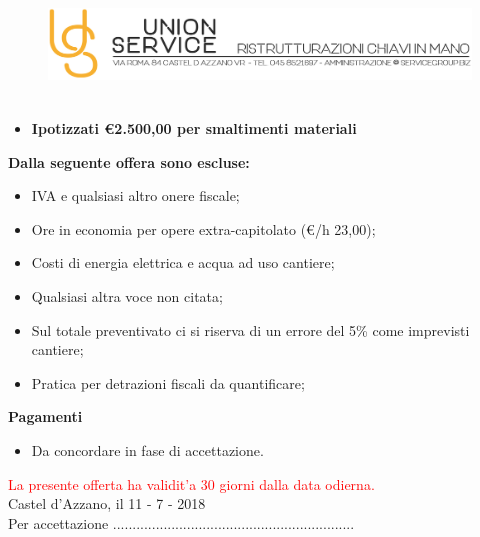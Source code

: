 \documentclass[a4paper]{article}
\begin{document}
                            \newpage
                                  \begin{figure}[!t]
                                  \includegraphics[width=15.8cm, height=3cm]{intestazioneAlta2.jpg}
                                  \end{figure}
                               
                          \begin{itemize}
                              \item \textbf{Ipotizzati \euro 2.500,00 per smaltimenti materiali}
                          \end{itemize}

                          \noindent\textbf{Dalla seguente offera sono escluse:}
                          \begin{itemize}
                              \item IVA e qualsiasi altro onere fiscale;
                              \item Ore in economia per opere extra-capitolato (\euro/h 23,00);
                              \item Costi di energia elettrica e acqua ad uso cantiere;
                              \item Qualsiasi altra voce non citata;
                              \item Sul totale preventivato ci si riserva di un errore del 5\% come imprevisti cantiere;
                              \item Pratica per detrazioni fiscali da quantificare;
                          \end{itemize}

                          \noindent\textbf{Pagamenti}
                          \begin{itemize}
                              \item Da concordare in fase di accettazione.
                          \end{itemize}

                          \textcolor{red}{La presente offerta ha validit'a 30 giorni dalla data odierna.}\\

                          Castel d'Azzano, il 11 - 7 - 2018
                          \vspace{1cm}\\
                          Per accettazione ..............................................................

                        
\end{document}
